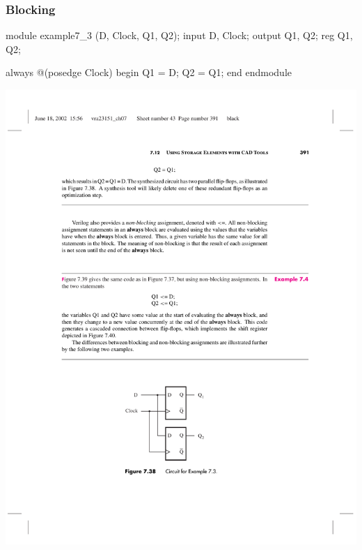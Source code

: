 \begin{frame}[fragile]
	\frametitle{Blocking}
	\begin{verilogcode}
module example7_3 (D, Clock, Q1, Q2); 
  input D, Clock;
  output Q1, Q2;
  reg Q1, Q2;

  always @(posedge Clock) 
  begin
    Q1 = D;
    Q2 = Q1;
  end 
endmodule
    \end{verilogcode}
    \includegraphics[scale=.7]{figs/VerilogFig7_38}
\end{frame}


